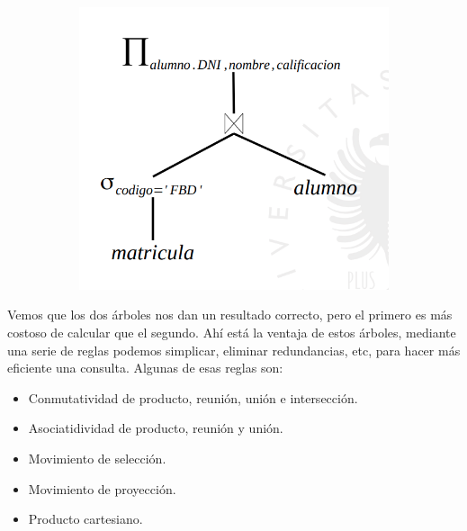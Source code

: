 \begin{example}
\begin{example}
\begin{figure}[H]
\begin{subfigure}{.5\textwidth}
\end{subfigure}%
\begin{subfigure}{.5\textwidth}
  \centering
  \includegraphics[scale=0.4]{img/4.png}
\end{subfigure}
\end{figure}
\end{example}
Vemos que los dos árboles nos dan un resultado correcto, pero el primero es más costoso de calcular que el segundo. Ahí está la ventaja de estos árboles, mediante una serie de reglas podemos simplicar, eliminar redundancias, etc, para hacer más eficiente una consulta. Algunas de esas reglas son:
\begin{itemize}
\item Conmutatividad de producto, reunión, unión e intersección.
\item Asociatidividad de producto, reunión y unión.
\item Movimiento de selección.
\item Movimiento de proyección.
\item Producto cartesiano.
\end{itemize}
\end{example}

